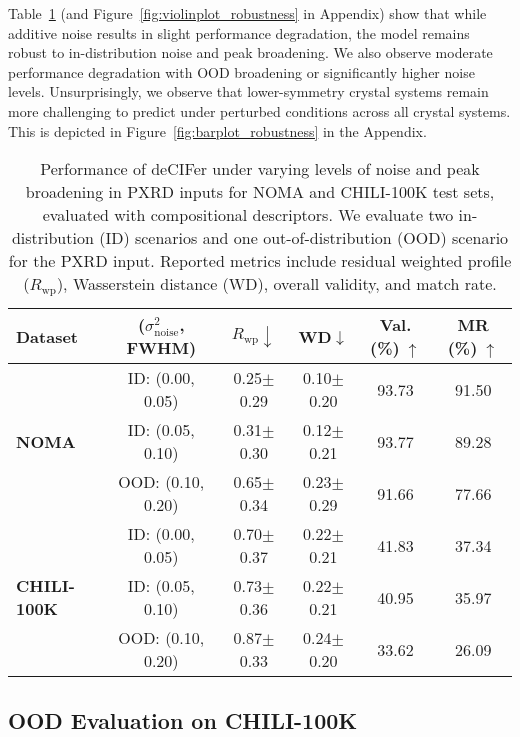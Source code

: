 Table~\ref{tab:robustness_performance} 
(and Figure~\ref{fig:violinplot_robustness} in Appendix) show that while additive noise results in slight performance degradation, the model remains robust to in-distribution noise and peak broadening. We also observe moderate performance degradation with OOD broadening or significantly higher noise levels. Unsurprisingly, we observe that lower-symmetry crystal systems remain more challenging to predict under perturbed conditions across all crystal systems. This is depicted in Figure~\ref{fig:barplot_robustness} in the Appendix.

\begin{table}[t]
\setlength{\tabcolsep}{2pt}
\caption{Performance of deCIFer under varying levels of noise and peak broadening in PXRD inputs for NOMA and CHILI-100K test sets, evaluated with compositional descriptors. We evaluate two in-distribution (ID) scenarios and one out-of-distribution (OOD) scenario for the PXRD input. Reported metrics include residual weighted profile ($R_{\mathrm{wp}}$), Wasserstein distance (WD), overall validity, and match rate.}
\label{tab:robustness_performance}
\vskip 0.15in
\begin{center}
\tiny
\begin{tabular}{lccccc}
\toprule
 {\bf Dataset} & ($\sigma_{\mathrm{noise}}^2$, {FWHM}) & $R_{\mathrm{wp}} \downarrow$  & WD$\downarrow$ & Val. (\%)$\;\uparrow$ & MR (\%)$\;\uparrow$\\
\midrule
\multirow{3}{*}{\bf NOMA} & ID: (0.00, 0.05)
& 0.25$\pm$0.29 & 0.10$\pm$0.20 & 93.73 & 91.50\\
 & ID: (0.05, 0.10)
& 0.31$\pm$0.30 & 0.12$\pm$0.21 & 93.77 & 89.28\\
\cmidrule{2-6}
 & OOD: (0.10, 0.20)
& 0.65$\pm$0.34 & 0.23$\pm$0.29 & 91.66 & 77.66\\
\midrule
\multirow{3}{*}{\bf CHILI-100K} &  ID: (0.00, 0.05)
& 0.70$\pm$0.37 & 0.22$\pm$0.21 & 41.83 & 37.34 \\
&  ID: (0.05, 0.10)
& 0.73$\pm$0.36 & 0.22$\pm$0.21 & 40.95 & 35.97\\
\cmidrule{2-6}
 & OOD: (0.10, 0.20)
& 0.87$\pm$0.33 & 0.24$\pm$0.20 & 33.62& 26.09\\
\bottomrule
\end{tabular}
\end{center}
\vskip -0.1in
\end{table}

\subsection{OOD Evaluation on CHILI-100K}

